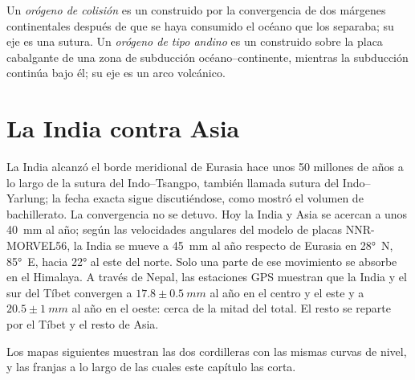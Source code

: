 \begin{definition}\label{def:b2:himalaya-andes:types}
Un \emph{orógeno de colisión} es un  construido por la convergencia de
dos márgenes continentales después de que se haya consumido el océano que los separaba; su eje es una sutura.
Un \emph{orógeno de tipo andino} es un  construido sobre la placa
cabalgante de una zona de subducción océano--continente, mientras la subducción continúa bajo él; su eje
es un arco volcánico.
\end{definition}


\section{La India contra Asia}\label{sec:b2:himalaya-andes:himalaya}

La India alcanzó el borde meridional de Eurasia hace unos 50 millones de años a lo largo de la sutura del Indo--Tsangpo,
también llamada sutura del Indo--Yarlung; la fecha exacta sigue discutiéndose, como mostró el
volumen de bachillerato. La convergencia no se detuvo. Hoy la India y Asia se acercan
a unos \qty{40}{mm} al año; según las velocidades angulares del modelo de placas NNR-MORVEL56,
la India se mueve a \qty{45}{mm} al año respecto de Eurasia en \ang{28}~N, \ang{85}~E, hacia
\ang{22} al este del norte. Solo una parte de ese movimiento se absorbe en el Himalaya. A través de Nepal,
las estaciones GPS muestran que la India y el sur del Tíbet convergen a $17.8 \pm \qty{0.5}{mm}$ al año en el
centro y el este y a $20.5 \pm \qty{1}{mm}$ al año en el oeste: cerca de la mitad del total. El resto
se reparte por el Tíbet y el resto de Asia.

Los mapas siguientes muestran las dos cordilleras con las mismas curvas de nivel, y las franjas a lo largo de las cuales este
capítulo las corta.

